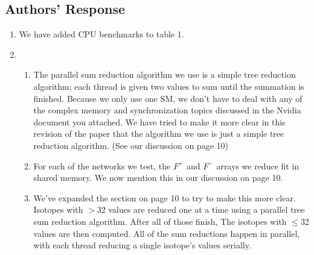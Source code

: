 \documentclass[12pt]{article}
\begin{document}
\subsection*{Authors' Response}
\begin{enumerate}
  \item We have added CPU benchmarks to table 1.
  \item
  \begin{enumerate}
    \item The parallel sum reduction algorithm we use is a simple tree reduction algorithm; each thread is given two values to sum until the summation is finished.  Because we only use one SM, we don't have to deal with any of the complex memory and synchronization topics discussed in the Nvidia document you attached.  We have tried to make it more clear in this revision of the paper that the algorithm we use is just a simple tree reduction algorithm.  (See our discussion on page 10)
    \item For each of the networks we test, the $F^{+}$ and $F^{-}$ arrays we reduce fit in shared memory.  We now mention this in our discussion on page 10.
    \item We've expanded the section on page 10 to try to make this more clear.  Isotopes with $>$32 values are reduced one at a time using a parallel tree sum reduction algorithm.  After all of those finish, The isotopes with $\leq$32 values are then computed.  All of the sum reductions happen in parallel, with each thread reducing a single isotope's values serially.
  \end{enumerate}
\end{enumerate}
\end{document}
